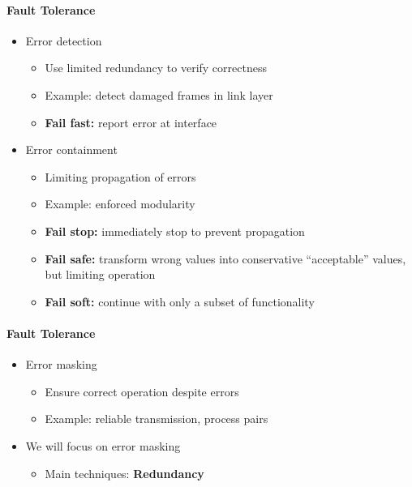 \paragraph{Fault Tolerance}
\begin{itemize}
\item Error detection
  \begin{itemize}
  \item Use limited redundancy to verify correctness
  \item Example: detect damaged frames in link layer
  \item \textbf{Fail fast:} report error at interface
  \end{itemize}
\end{itemize}

\begin{itemize}
\item Error containment
  \begin{itemize}
  \item Limiting propagation of errors
  \item Example: enforced modularity
  \item \textbf{Fail stop:} immediately stop to prevent propagation
  \item \textbf{Fail safe:} transform wrong values into
    conservative ``acceptable'' values, but limiting operation
  \item \textbf{Fail soft:} continue with only a subset of
    functionality
  \end{itemize}
\end{itemize}

\paragraph{Fault Tolerance}
\begin{itemize}
\item Error masking
  \begin{itemize}
  \item Ensure correct operation despite errors
  \item Example: reliable transmission, process pairs
  \end{itemize}

\item We will focus on error masking
  \begin{itemize}
  \item Main techniques: \textbf{Redundancy}
  \end{itemize}
\end{itemize}

